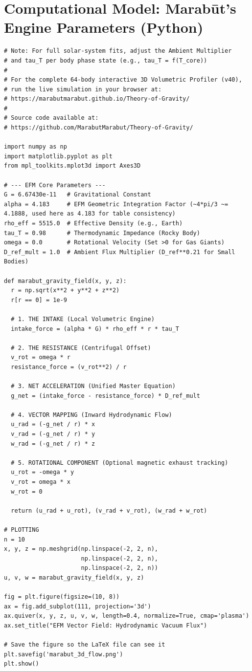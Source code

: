\documentclass[11pt, a4paper]{article}
\begin{document}
\clearpage
\appendix
\section{Computational Model: Marab\={u}t's Engine Parameters (Python)}
\begin{verbatim}
# Note: For full solar-system fits, adjust the Ambient Multiplier 
# and tau_T per body phase state (e.g., tau_T = f(T_core))
#
# For the complete 64-body interactive 3D Volumetric Profiler (v40), 
# run the live simulation in your browser at: 
# https://marabutmarabut.github.io/Theory-of-Gravity/
#
# Source code available at:
# https://github.com/MarabutMarabut/Theory-of-Gravity/

import numpy as np
import matplotlib.pyplot as plt
from mpl_toolkits.mplot3d import Axes3D

# --- EFM Core Parameters ---
G = 6.67430e-11   # Gravitational Constant
alpha = 4.183     # EFM Geometric Integration Factor (~4*pi/3 ~= 4.1888, used here as 4.183 for table consistency)
rho_eff = 5515.0  # Effective Density (e.g., Earth)
tau_T = 0.98      # Thermodynamic Impedance (Rocky Body)
omega = 0.0       # Rotational Velocity (Set >0 for Gas Giants)
D_ref_mult = 1.0  # Ambient Flux Multiplier (D_ref**0.21 for Small Bodies)

def marabut_gravity_field(x, y, z):
  r = np.sqrt(x**2 + y**2 + z**2)
  r[r == 0] = 1e-9 

  # 1. THE INTAKE (Local Volumetric Engine)
  intake_force = (alpha * G) * rho_eff * r * tau_T

  # 2. THE RESISTANCE (Centrifugal Offset)
  v_rot = omega * r
  resistance_force = (v_rot**2) / r

  # 3. NET ACCELERATION (Unified Master Equation)
  g_net = (intake_force - resistance_force) * D_ref_mult

  # 4. VECTOR MAPPING (Inward Hydrodynamic Flow)
  u_rad = (-g_net / r) * x
  v_rad = (-g_net / r) * y
  w_rad = (-g_net / r) * z
  
  # 5. ROTATIONAL COMPONENT (Optional magnetic exhaust tracking)
  u_rot = -omega * y
  v_rot = omega * x
  w_rot = 0

  return (u_rad + u_rot), (v_rad + v_rot), (w_rad + w_rot)

# PLOTTING
n = 10
x, y, z = np.meshgrid(np.linspace(-2, 2, n), 
                      np.linspace(-2, 2, n), 
                      np.linspace(-2, 2, n))
u, v, w = marabut_gravity_field(x, y, z)

fig = plt.figure(figsize=(10, 8))
ax = fig.add_subplot(111, projection='3d')
ax.quiver(x, y, z, u, v, w, length=0.4, normalize=True, cmap='plasma')
ax.set_title("EFM Vector Field: Hydrodynamic Vacuum Flux")

# Save the figure so the LaTeX file can see it
plt.savefig('marabut_3d_flow.png') 
plt.show()
\end{verbatim}
\end{document}
